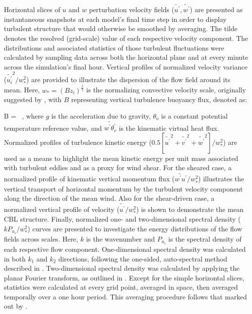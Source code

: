 Horizontal slices of $u$ and $w$ perturbation velocity fields ($\widetilde{u^{\prime}}, \widetilde{w^{\prime}}$) are presented as instantaneous snapshots at each model's final time step in order to display turbulent structure that would otherwise be smoothed by averaging. The tilde denotes the resolved (grid-scale) value of each respective velocity component. The distributions and associated statistics of those turbulent fluctuations were calculated by sampling data across both the horizontal plane and at every minute across the simulation's final hour. Vertical profiles of normalized velocity variance ($ \widetilde{u_i^{\prime}}^2  / w_*^2$) are provided to illustrate the dispersion of the flow field around its mean. Here, $w_*= (Bz_i)^{\frac{1}{3}}$ is the normalizing convective velocity scale, originally suggested by  \citet{Deardorff1970}, with $B$ representing vertical turbulence buoyancy flux, denoted as:

\be
B =   \mbox{ ,}
\ee
\noindent
where $g$ is the acceleration due to gravity, $\theta_o$ is a constant potential temperature reference value, and $\widetilde{w^{\prime}\theta_v^{\prime}}$ is the kinematic virtual heat flux. Normalized profiles of turbulence kinetic energy ($0.5[\widetilde{u^{\prime}}^2 + \widetilde{v^{\prime}}^2 + \widetilde{w^{\prime}}^2] / w_*^2$) are used as a means to highlight the mean kinetic energy per unit mass associated with turbulent eddies and as a proxy for wind shear. For the sheared case, a normalized profile of kinematic vertical momentum flux ($ \widetilde{w^{\prime}u^{\prime}} / w_*^2$) illustrates the vertical transport of horizontal momentum by the turbulent velocity component along the direction of the mean wind. Also for the shear-driven case, a normalized vertical profile of velocity ($\widetilde{u^{\prime}} / w_*^2$) is shown to demonstrate the mean CBL structure. Finally, normalized one- and two-dimensional spectral density ($kP_{u_i} / w_*^2$) curves are presented to investigate the energy distributions of the flow fields across scales. Here, $k$ is the wavenumber and $P_{u_i}$ is the spectral density of each respective flow component. One-dimensional spectral density was calculated in both $k_1$ and $k_2$ directions, following the one-sided, auto-spectral method described in  \citet{KaiserFeddy}. Two-dimensional spectral density was calculated by applying the planar Fourier transform, as outlined in  \citet{KellyWyngaard2006}. Except for the simple horizontal slices, statistics were calculated at every grid point, averaged in space, then averaged temporally over a one hour period. This averaging procedure follows that marked out by  \citet{KaiserFeddy}.

